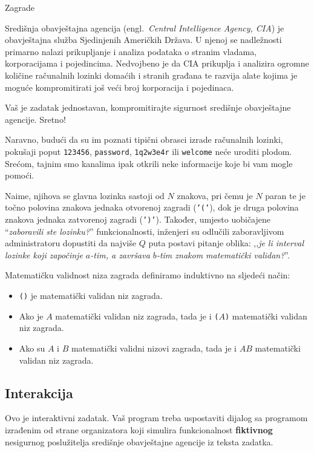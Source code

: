 \begin{statement}[
  problempoints=100,
  timelimit=3 sekunde,
  memorylimit=512 MiB,
]{Zagrade}

Središnja obavještajna agencija (engl.\ \textit{Central Intelligence Agency,
CIA}) je obavještajna služba Sjedinjenih Američkih Država. U njenoj se
nadležnosti primarno nalazi prikupljanje i analiza podataka o stranim
vladama, korporacijama i pojedincima. Nedvojbeno je da CIA prikuplja i analizira
ogromne količine računalnih lozinki domaćih i stranih građana te razvija alate
kojima je moguće kompromitirati još veći broj korporacija i pojedinaca.

Vaš je zadatak jednostavan, kompromitirajte sigurnost središnje obavještajne
agencije. Sretno!

Naravno, budući da su im poznati tipični obrasci izrade računalnih lozinki,
pokušaji poput \texttt{123456}, \texttt{password}, \texttt{1q2w3e4r} ili
\texttt{welcome} neće uroditi plodom. Srećom, tajnim smo kanalima ipak otkrili
neke informacije koje bi vam mogle pomoći.

Naime, njihova se glavna lozinka sastoji od $N$ znakova, pri čemu je $N$ paran
te je točno polovina znakova jednaka otvorenoj zagradi (\texttt{'('}), dok je
druga polovina znakova jednaka zatvorenoj zagradi (\texttt{')'}). Također,
  umjesto uobičajene ``\textit{zaboravili ste lozinku?}'' funkcionalnosti,
inženjeri su odlučili zaboravljivom administratoru dopustiti da
najviše $Q$ puta postavi pitanje oblika: ,,\textit{je li interval lozinke koji
započinje $a$-tim, a završava $b$-tim znakom matematički validan?}''.

Matematičku validnost niza zagrada definiramo induktivno na sljedeći način:

\begin{itemize}
  \item \texttt{()} je matematički validan niz zagrada.
  \item Ako je $A$ matematički validan niz zagrada, tada je i
    \texttt{(}$A$\texttt{)} matematički validan niz zagrada.
  \item Ako su $A$ i $B$ matematički validni nizovi zagrada,
        tada je i $AB$ matematički validan niz zagrada.
\end{itemize}

\subsection*{Interakcija}
Ovo je interaktivni zadatak. Vaš program treba uspostaviti dijalog sa programom
izrađenim od strane organizatora koji simulira funkcionalnost
\textbf{fiktivnog} nesigurnog poslužitelja središnje obavještajne agencije iz
teksta zadatka.


\end{statement}
